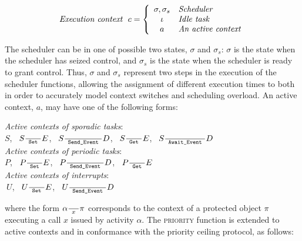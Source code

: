 \begin{displaymath} 
\centering
\textit{Execution context} \ \ c = 
  \left\{ \begin{array}{cl}
    \sigma,\sigma_s & \textit{Scheduler}\\
    \iota & \textit{Idle task}\\
    a & \textit{An active context}
  \end{array}
  \right.
\end{displaymath}

The scheduler can be in one of possible two states, $\sigma$ and
$\sigma_s$: $\sigma$ is the state when the scheduler has seized
control, and $\sigma_s$ is the state when the scheduler is ready to
grant control. Thus, $\sigma$ and $\sigma_s$ represent two steps in
the execution of the scheduler functions, allowing the assignment of
different execution times to both in order to accurately model context
switches and scheduling overload. An active context, $a$, may have one
of the following forms:\\

\begin{center}
\emph{Active contexts of sporadic tasks}:\\
    \hspace*{2mm} $S$,  
	\  $S \frac{}{\text{\ttfamily\ Set\ }} E$, 
	\ $S \frac{}{\text{\ttfamily\ Send\_Event\ }} D$, 
	\ $S \frac{}{\text{\ttfamily\ Get\ }} E$, 
	\ $S  \frac{}{\text{\ttfamily\ Await\_Event\ }}  D$ \vspace{1mm} \\
\emph{Active contexts of periodic tasks}: \\
     \hspace*{2mm} $P$, 
	\  $P \frac{}{\text{\ttfamily\ Set\ }} E$, 
	\  $P \frac{}{\text{\ttfamily\ Send\_Event\ }} D$,  
	\  $P \frac{}{\text{\ttfamily\ Get\ }} E$ 	\vspace{2mm} \\
\emph{Active contexts of interrupts}: \\
     \hspace*{2mm} $\ U$, 
	\  $U \frac{}{\text{\ttfamily\ Set\ }} E$, 
	\  $U \frac{}{\text{\ttfamily\ Send\_Event\ }} D$  \\
\end{center}
%
%
where the form $\alpha \frac{}{\large \ x \ } \pi$ corresponds  to the context of a protected
object $\pi$ executing a call $x$ issued by activity
$\alpha$. The {\scshape priority} function is extended to active
contexts and in conformance with the priority ceiling protocol, as follows:

